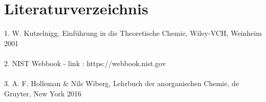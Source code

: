 %
%

\section{Literaturverzeichnis}
1. W. Kutzelnigg, Einführung in die Theoretische Chemie, Wiley-VCH, Weinheim 2001
\\
\\
2. NIST Webbook - link : https://webbook.nist.gov
\\
\\
3. A. F. Holleman \& Nils Wiberg, Lehrbuch der anorganischen Chemie,  de Gruyter, New York 2016
%

